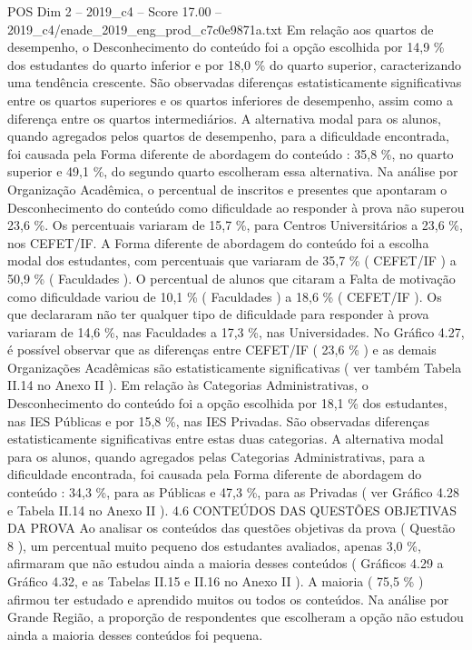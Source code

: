 \begin{textsample}{POS Dim 2 – 2019\_c4 – Score 17.00 – 2019\_c4/enade\_2019\_eng\_prod\_c7c0e9871a.txt}
Em relação aos quartos de desempenho, o Desconhecimento do conteúdo foi a opção escolhida por 14,9 \% dos estudantes do quarto inferior e por 18,0 \% do quarto superior, caracterizando uma tendência crescente.
São observadas diferenças estatisticamente significativas entre os quartos superiores e os quartos inferiores de desempenho, assim como a diferença entre os quartos intermediários.
A alternativa modal para os alunos, quando agregados pelos quartos de desempenho, para a dificuldade encontrada, foi causada pela Forma diferente de abordagem do conteúdo : 35,8 \%, no quarto superior e 49,1 \%, do segundo quarto escolheram essa alternativa.
Na análise por Organização Acadêmica, o percentual de inscritos e presentes que apontaram o Desconhecimento do conteúdo como dificuldade ao responder à prova não superou 23,6 \%.
Os percentuais variaram de 15,7 \%, para Centros Universitários a 23,6 \%, nos CEFET/IF.
A Forma diferente de abordagem do conteúdo foi a escolha modal dos estudantes, com percentuais que variaram de 35,7 \% ( CEFET/IF ) a 50,9 \% ( Faculdades ).
O percentual de alunos que citaram a Falta de motivação como dificuldade variou de 10,1 \% ( Faculdades ) a 18,6 \% ( CEFET/IF ).
Os que declararam não ter qualquer tipo de dificuldade para responder à prova variaram de 14,6 \%, nas Faculdades a 17,3 \%, nas Universidades.
No Gráfico 4.27, é possível observar que as diferenças entre CEFET/IF ( 23,6 \% ) e as demais Organizações Acadêmicas são estatisticamente significativas ( ver também Tabela II.14 no Anexo II ).
Em relação às Categorias Administrativas, o Desconhecimento do conteúdo foi a opção escolhida por 18,1 \% dos estudantes, nas IES Públicas e por 15,8 \%, nas IES Privadas.
São observadas diferenças estatisticamente significativas entre estas duas categorias.
A alternativa modal para os alunos, quando agregados pelas Categorias Administrativas, para a dificuldade encontrada, foi causada pela Forma diferente de abordagem do conteúdo : 34,3 \%, para as Públicas e 47,3 \%, para as Privadas ( ver Gráfico 4.28 e Tabela II.14 no Anexo II ). 4.6 CONTEÚDOS DAS QUESTÕES OBJETIVAS DA PROVA Ao analisar os conteúdos das questões objetivas da prova ( Questão 8 ), um percentual muito pequeno dos estudantes avaliados, apenas 3,0 \%, afirmaram que não estudou ainda a maioria desses conteúdos ( Gráficos 4.29 a Gráfico 4.32, e as Tabelas II.15 e II.16 no Anexo II ).
A maioria ( 75,5 \% ) afirmou ter estudado e aprendido muitos ou todos os conteúdos.
Na análise por Grande Região, a proporção de respondentes que escolheram a opção não estudou ainda a maioria desses conteúdos foi pequena.

\end{textsample}
